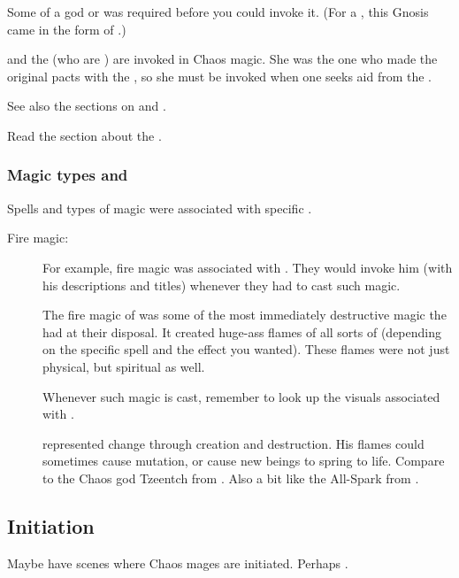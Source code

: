 Some  of a god or \daemon{} was required before you could invoke it. 
(For a \rethyax, this Gnosis came in the form of .)

\Tiamat{} and the \firstgendragons{} (who are ) are invoked in Chaos magic. 
She was the one who made the original pacts with the \xss, so she must be invoked when one seeks aid from the \xss. 

See also the sections on  and . 

Read the section about the . 





\subsubsection{Magic types and \xss}
Spells and types of magic were associated with specific \xss.

\begin{description}
  \item[Fire magic:]
    For example, fire magic was {associated with \RuinSatha}. 
    They would invoke him (with his descriptions and titles) whenever they had to cast such magic. 
    
    The fire magic of \RuinSatha was some of the most immediately destructive magic the \dragons had at their disposal.
    It created huge-ass flames of all sorts of \colours (depending on the specific spell and the effect you wanted). 
    These flames were not just physical, but spiritual as well. 
    
    Whenever such magic is cast, remember to look up the visuals associated with .
    
    \RuinSatha represented change through creation and destruction. 
    His flames could sometimes cause mutation, or cause new beings to spring to life. 
    Compare to the Chaos god Tzeentch from \cite{RPG:Warhammer40000}. 
    Also a bit like the All-Spark from \cite{Movie:Transformers2007}.
\end{description}









\subsection{Initiation}
Maybe have scenes where Chaos mages are initiated. 
Perhaps .

